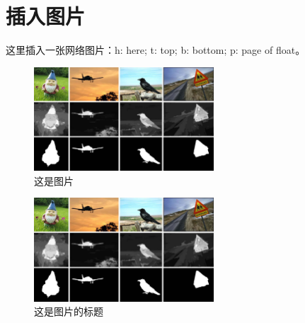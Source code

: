 \documentclass{article}
\begin{document}
\begin{CJK*}{UTF8}{gbsn}
\begin{flushleft}
		\end{flushleft}

		\clearpage
		\section{插入图片}
		这里插入一张网络图片：h: here; t: top; b: bottom; p: page of float。
		\renewcommand{\figurename}{图} %
		\begin{figure}[htbp]
			\centering
			\centering
			\includegraphics[width=0.6\textwidth]{./figures/teaser.jpg}
			\caption{这是图片}
		\end{figure}


		\begin{figure}[htbp]
			\centering
			\includegraphics[width=0.6\textwidth]{./figures/teaser.jpg}
			\caption{这是图片的标题}
		\end{figure}



\end{CJK*}
\end{document}

